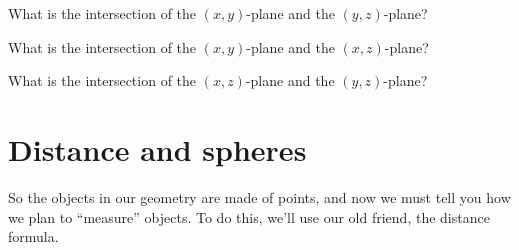 \documentclass{ximera}
\begin{document}
\begin{question}
  What is the intersection of the $(x,y)$-plane and the $(y,z)$-plane?
  \begin{prompt}
    \begin{multipleChoice}
    \end{multipleChoice}
  \end{prompt}
  \begin{question}
  What is the intersection of the $(x,y)$-plane and the $(x,z)$-plane?
  \begin{prompt}
    \begin{multipleChoice}
    \end{multipleChoice}
  \end{prompt}
  \begin{question}
    What is the intersection of the $(x,z)$-plane and the $(y,z)$-plane?
    \begin{prompt}
      \begin{multipleChoice}
      \end{multipleChoice}
    \end{prompt}
  \end{question}
  \end{question}
\end{question}




\section{Distance and spheres}

So the objects in our geometry are made of points, and now we must
tell you how we plan to ``measure'' objects. To do this, we'll use our
old friend, the distance formula.
\end{document}
